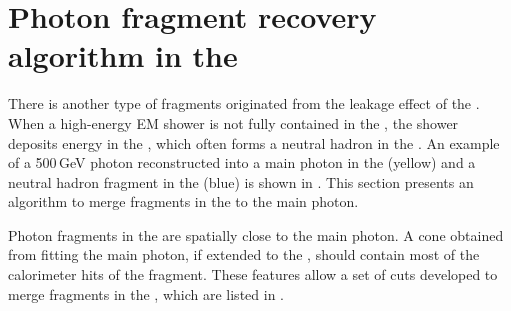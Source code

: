 \begin{table}[htbp]
\caption[The cuts for photon fragment removal algorithm in the \ECAL.]%
{The cuts for merging photon$-$photon-fragment pairs and photon$-$neutral-hadron-fragment pairs for both low energy and high energy fragments, immediately after photon reconstruction. Variables $d$, $d_c$ and $d_h$ are the mean energy weighted intra-layer distance of the pair, the distance between centroids, the minimum distance between calorimeter hits of the pair, respectively. Variables $E_m$ and $E_f$ are the main photon energy and the fragment energy, respectively. Variables $E_{p1}$ and $E_{p2}$ are the energies the two largest peaks, found by peak finding algorithm, ordered by descending energy, respectively. $N_{calo}$ is the number of the calorimeter hits in the fragment.}
\label{tab:photonFragRemovalCuts2}
\end{table}
\section{Photon fragment recovery algorithm in the \HCAL}
\label{sec:photonHighEFragRemoval}


There is another type of fragments originated from the leakage effect of the \ECAL. When a high-energy EM shower is not fully contained in the \ECAL, the shower deposits energy in the \HCAL, which often forms a neutral hadron in the \HCAL. An example of a 500\,GeV photon reconstructed into a main photon in the \ECAL (yellow) and a neutral hadron fragment in the \HCAL (blue) is shown in . This section presents an algorithm to merge fragments in the \HCAL to the main photon. 




Photon fragments in the \HCAL are  spatially close to the main photon. A cone obtained from fitting the main photon, if extended to the \HCAL, should contain most of the calorimeter hits of the fragment. These features allow a set of cuts developed to merge  fragments in the \HCAL, which are listed in .

